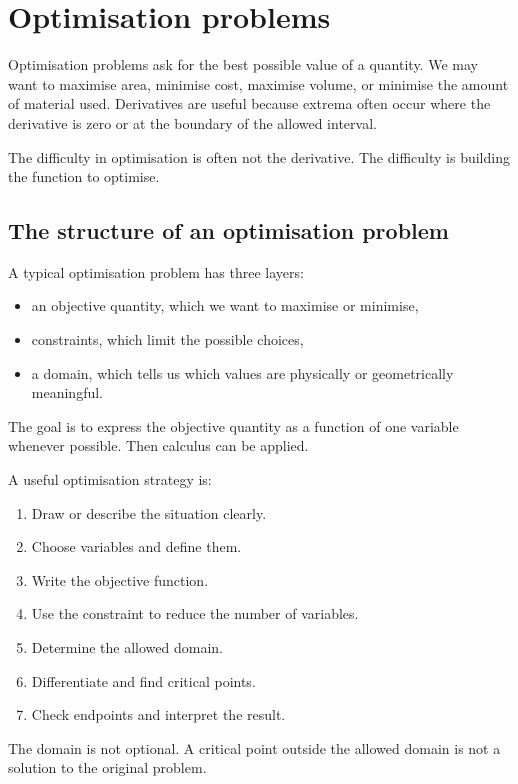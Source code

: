 \section{Optimisation problems}

Optimisation problems ask for the best possible value of a quantity. We may want to maximise area, minimise cost, maximise volume, or minimise the amount of material used. Derivatives are useful because extrema often occur where the derivative is zero or at the boundary of the allowed interval.

The difficulty in optimisation is often not the derivative. The difficulty is building the function to optimise.

\subsection*{The structure of an optimisation problem}

A typical optimisation problem has three layers:
\begin{itemize}
\item an objective quantity, which we want to maximise or minimise,
\item constraints, which limit the possible choices,
\item a domain, which tells us which values are physically or geometrically meaningful.
\end{itemize}

The goal is to express the objective quantity as a function of one variable whenever possible. Then calculus can be applied.

\begin{summarybox}
A useful optimisation strategy is:
\begin{enumerate}
\item Draw or describe the situation clearly.
\item Choose variables and define them.
\item Write the objective function.
\item Use the constraint to reduce the number of variables.
\item Determine the allowed domain.
\item Differentiate and find critical points.
\item Check endpoints and interpret the result.
\end{enumerate}
\end{summarybox}

The domain is not optional. A critical point outside the allowed domain is not a solution to the original problem.

